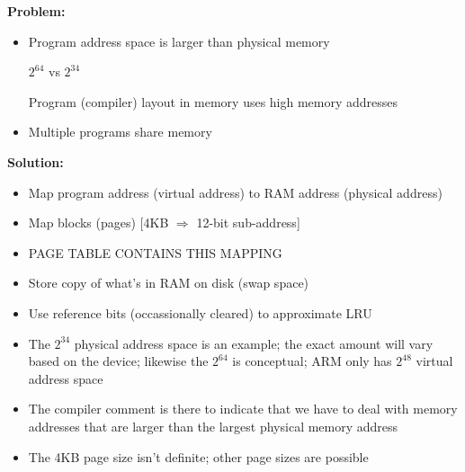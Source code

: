 


\begin{frame}[fragile]
  {\bf Problem:}
  \begin{itemize}
  \item Program address space is larger than physical memory

    $2^{64}$ vs $2^{34}$

    Program (compiler) layout in memory uses high memory addresses
    \item Multiple programs share memory
  \end{itemize}
  {\bf Solution:}
  \begin{itemize}
  \item Map program address (virtual address) to RAM address (physical address)
  \item Map blocks (pages) [4KB $\Rightarrow$ 12-bit sub-address]
  \item PAGE TABLE CONTAINS THIS MAPPING
  \item Store copy of what's in RAM on disk (swap space)
  \item Use reference bits (occassionally cleared) to approximate LRU
  \end{itemize}

  \BNotes\ifnum{}
  \begin{itemize}
  \item The $2^{34}$ physical address space is an example; the exact amount
    will vary based on the device; likewise the $2^{64}$ is conceptual; ARM
    only has $2^{48}$ virtual address space
  \item The compiler comment is there to indicate that we have to deal with
    memory addresses that are larger than the largest physical memory address
  \item The 4KB page size isn't definite; other page sizes are possible
    \end{itemize}
  \fi\ENotes
\end{frame}

